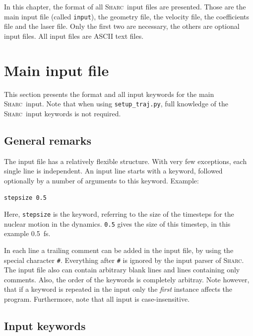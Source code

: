 \documentclass[a4paper,11pt,DIV=15,openany,twoside=false]{scrbook}
\newcommand{\sharc}{\textsc{Sharc}}
\newcommand{\ttt}[1]{\texttt{#1}}
\newenvironment{example}{
  \vspace{0mm}
  \definecolor{shadecolor}{HTML}{BBDDFF}
  \begin{shaded}
  \begin{minipage}{0.9\textwidth}
}{
  \end{minipage}
  \end{shaded}
}
\begin{document}
In this chapter, the format of all \sharc\ input files are presented. Those are the main input file (called \ttt{input}), the geometry file, the velocity file, the coefficients file and the laser file. Only the first two are necessary, the others are optional input files. All input files are ASCII text files.


\section{Main input file}\label{sec:inputfile}

This section presents the format and all input keywords for the main \sharc\ input. Note that when using \ttt{setup\_traj.py}, full knowledge of the \sharc\ input keywords is not required.

\subsection{General remarks}

The input file has a relatively flexible structure. With very few exceptions, each single line is independent. An input line starts with a keyword, followed optionally by a number of arguments to this keyword. Example:

\begin{example}
  \ttt{stepsize 0.5}
\end{example}

Here, \ttt{stepsize} is the keyword, referring to the size of the timesteps for the nuclear motion in the dynamics. \ttt{0.5} gives the size of this timestep, in this example 0.5~fs.

In each line a trailing comment can be added in the input file, by using the special character \ttt{\#}. Everything after \ttt{\#} is ignored by the input parser of \sharc. The input file also can contain arbitrary blank lines and lines containing only comments. Also, the order of the keywords is completely arbitray. Note however, that if a keyword is repeated in the input only the \textit{first} instance affects the program. Furthermore, note that all input is case-insensitive.

\subsection{Input keywords}
\end{document}
